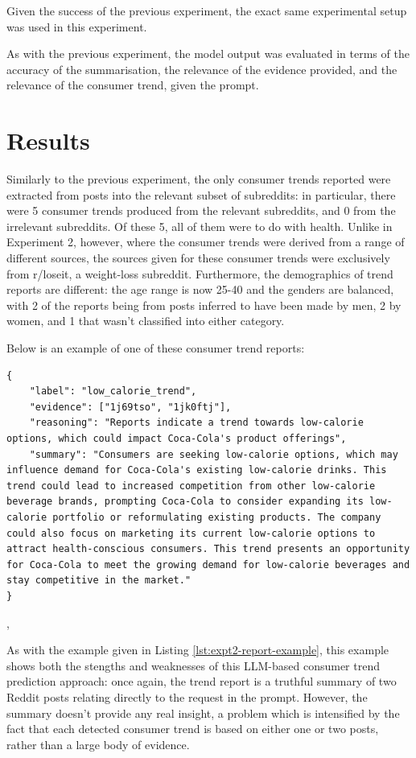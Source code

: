 \documentclass{report}
\begin{document}
Given the success of the previous experiment, the exact same experimental setup was used in this experiment.

As with the previous experiment, the model output was evaluated in terms of the accuracy of the summarisation, the relevance of the evidence provided, and the relevance of the consumer trend, given the prompt.

\section{Results}

Similarly to the previous experiment, the only consumer trends reported were extracted from posts into the relevant subset of subreddits: in particular, there were 5 consumer trends produced from the relevant subreddits, and 0 from the irrelevant subreddits. Of these 5, all of them were to do with health. Unlike in Experiment 2, however, where the consumer trends were derived from a range of different sources, the sources given for these consumer trends were exclusively from r/loseit, a weight-loss subreddit. Furthermore, the demographics of trend reports are different: the age range is now 25-40 and the genders are balanced, with 2 of the reports being from posts inferred to have been made by men, 2 by women, and 1 that wasn't classified into either category.

Below is an example of one of these consumer trend reports:
\begin{listing}[H]
\centering
\begin{minipage}{\linewidth}
\begin{lstlisting}[style=promptstyle]
{
    "label": "low_calorie_trend",
    "evidence": ["1j69tso", "1jk0ftj"], 
    "reasoning": "Reports indicate a trend towards low-calorie options, which could impact Coca-Cola's product offerings",
    "summary": "Consumers are seeking low-calorie options, which may influence demand for Coca-Cola's existing low-calorie drinks. This trend could lead to increased competition from other low-calorie beverage brands, prompting Coca-Cola to consider expanding its low-calorie portfolio or reformulating existing products. The company could also focus on marketing its current low-calorie options to attract health-conscious consumers. This trend presents an opportunity for Coca-Cola to meet the growing demand for low-calorie beverages and stay competitive in the market."
}
\end{lstlisting}
\end{minipage}
\caption{Example of a consumer trend report, based on posts from r/loseit and r/nutrition, generated by Llama-3.3 70B Versatile},
\end{listing}
As with the example given in Listing \ref{lst:expt2-report-example}, this example shows both the stengths and weaknesses of this LLM-based consumer trend prediction approach: once again, the trend report is a truthful summary of two Reddit posts relating directly to the request in the prompt. However, the summary doesn't provide any real insight, a problem which is intensified by the fact that each detected consumer trend is based on either one or two posts, rather than a large body of evidence.
\end{document}

